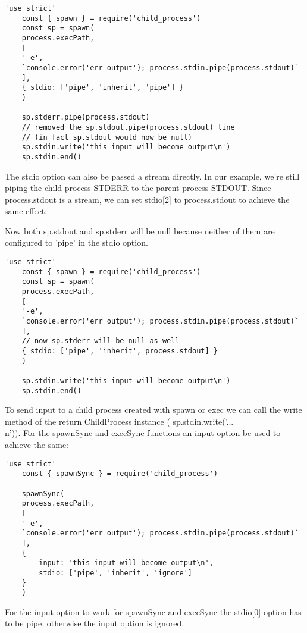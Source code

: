 \documentclass{scrartcl}
\begin{document}
\begin{lstlisting}[style=ES6]
    'use strict'
    const { spawn } = require('child_process')
    const sp = spawn(
    process.execPath,
    [
    '-e',
    `console.error('err output'); process.stdin.pipe(process.stdout)`
    ],
    { stdio: ['pipe', 'inherit', 'pipe'] }
    )

    sp.stderr.pipe(process.stdout)
    // removed the sp.stdout.pipe(process.stdout) line
    // (in fact sp.stdout would now be null)
    sp.stdin.write('this input will become output\n')
    sp.stdin.end()
\end{lstlisting}

The stdio option can also be passed a stream directly. In our example, we're still piping the child process STDERR to the parent process STDOUT. Since process.stdout is a stream, we can set stdio[2] to process.stdout to achieve the same effect:



Now both sp.stdout and sp.stderr will be null because neither of them are configured to 'pipe' in the stdio option.

\begin{lstlisting}[style=ES6]
    'use strict'
    const { spawn } = require('child_process')
    const sp = spawn(
    process.execPath,
    [
    '-e',
    `console.error('err output'); process.stdin.pipe(process.stdout)`
    ],
    // now sp.stderr will be null as well
    { stdio: ['pipe', 'inherit', process.stdout] }
    )

    sp.stdin.write('this input will become output\n')
    sp.stdin.end()
\end{lstlisting}

To send input to a child process created with spawn or exec we can call the write method of the return ChildProcess instance ( sp.stdin.write('...\\n')).
For the spawnSync and execSync functions an input option be used to achieve the same:

\begin{lstlisting}[style=ES6]
    'use strict'
    const { spawnSync } = require('child_process')

    spawnSync(
    process.execPath,
    [
    '-e',
    `console.error('err output'); process.stdin.pipe(process.stdout)`
    ],
    {
        input: 'this input will become output\n',
        stdio: ['pipe', 'inherit', 'ignore']
    }
    )
\end{lstlisting}

For the input option to work for spawnSync and execSync the stdio[0] option has to be pipe, otherwise the input option is ignored.
\end{document}
